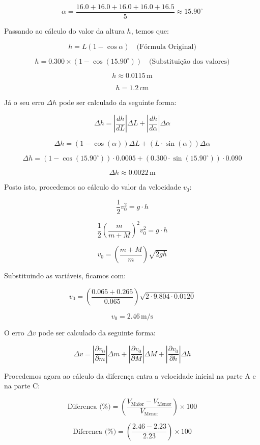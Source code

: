 \documentclass{report}
\begin{document}
\[
\alpha = \frac{16.0 + 16.0 + 16.0 + 16.0 + 16.5}{5} \approx 15.90^\circ
\]

Passando ao cálculo do valor da altura \(h\), temos que:

\[
h = L(1 - \cos \alpha) \quad \text{(Fórmula Original)}
\]

\[
h = 0.300 \times (1 - \cos(15.90^\circ)) \quad \text{(Substituição dos valores)}
\]

\[
h \approx 0.0115 \, \text{m}
\]

\[
h = 1.2 \, \text{cm}
\]

\vspace{1cm}

Já o seu erro \(\Delta h\) pode ser calculado da seguinte forma:

\[
\Delta h = \left| \frac{dh}{dL} \right| \Delta L + \left| \frac{dh}{d\alpha} \right| \Delta \alpha
\]

\[
\Delta h = (1 - \cos(\alpha)) \Delta L + (L \cdot \sin(\alpha)) \Delta \alpha
\]

\[
\Delta h = (1 - \cos(15.90^\circ)) \cdot 0.0005 + (0.300 \cdot \sin(15.90^\circ)) \cdot 0.090
\]

\[
\Delta h \approx 0.0022 \, \text{m}
\]

Posto isto, procedemos ao cálculo do valor da velocidade \(v_0\):

\[
\frac{1}{2}v_0^2 = g \cdot h
\]

\[
\frac{1}{2} \left( \frac{m}{m + M} \right)^2 v_0^2 = g \cdot h
\]

\[
v_0 = \left( \frac{m + M}{m} \right) \sqrt{2gh}
\]

Substituindo as variáveis, ficamos com:

\[
v_0 = \left( \frac{0.065 + 0.265}{0.065} \right) \sqrt{2 \cdot 9.804 \cdot 0.0120}
\]

\[
v_0 = 2.46 \, \text{m/s}
\]

O erro \(\Delta v\) pode ser calculado da seguinte forma:

\[
\Delta v = \left| \frac{\partial v_0}{\partial m} \right| \Delta m + \left| \frac{\partial v_0}{\partial M} \right| \Delta M + \left| \frac{\partial v_0}{\partial h} \right| \Delta h
\]

Procedemos agora ao cálculo da diferença entra a velocidade inicial na parte A e na parte C:


\[
\text{Diferenca (\%)} = \left( \frac{V_{\text{Maior}} - V_{\text{Menor}}}{V_{\text{Menor}}} \right) \times 100
\]

\[
\text{Diferenca (\%)} = \left( \frac{2.46 - 2.23}{2.23} \right) \times 100
\]
\end{document}
